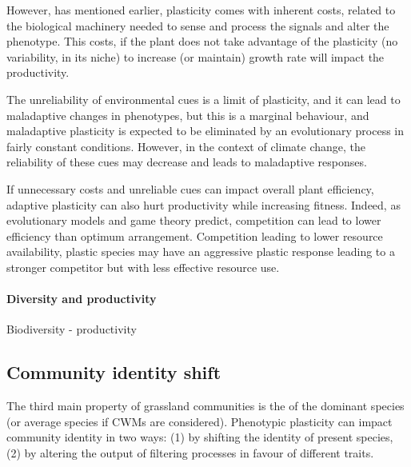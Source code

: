 {However, has mentioned earlier, plasticity comes with inherent costs, related to the biological machinery needed to sense and process the signals and alter the phenotype. This costs, if the plant does not take advantage of the plasticity (no variability, in its niche) to increase (or maintain) growth rate will impact the productivity.

The unreliability of environmental cues is a limit of plasticity, and it can lead to maladaptive changes in phenotypes, but this is a marginal behaviour, and maladaptive plasticity is expected to be eliminated by an evolutionary process in fairly constant conditions. However, in the context of climate change, the reliability of these cues may decrease and leads to maladaptive responses. 

If unnecessary costs and unreliable cues can impact overall plant efficiency, adaptive plasticity can also hurt productivity while increasing fitness. Indeed, as evolutionary models and game theory predict, competition can lead to lower efficiency than optimum arrangement. Competition leading to lower resource availability, plastic species may have an aggressive plastic response leading to a stronger competitor but with less effective resource use.


\paragraph{Diversity and productivity}

Biodiversity - productivity
%
%


\subsection{Community identity shift}

The third main property of grassland communities is the  of the dominant species (or average species if CWMs are considered). Phenotypic plasticity can impact community identity in two ways: (1) by shifting the identity of present species, (2) by altering the output of filtering processes in favour of different traits.


}
